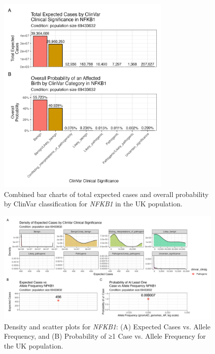 \begin{figure}[ht]
  \centering
  \includegraphics[width=0.75\textwidth]{../images/nfkb1_combined_bar_charts.png}
  \caption{Combined bar charts of total expected cases and overall probability by ClinVar classification for \textit{NFKB1} in the UK population.}
  \label{fig:nfkb1_combined_bar_charts}
\end{figure}

\begin{figure}[ht]
  \centering
  \includegraphics[width=0.99\textwidth]{../images/nfkb1_scatterdense_expected_prob.png}
  \caption{Density and scatter plots for \textit{NFKB1}: (A) Expected Cases vs. Allele Frequency, and (B) Probability of ≥1 Case vs. Allele Frequency for the UK population.}
  \label{fig:nfkb1_scatterdense_expected_prob}
\end{figure}

